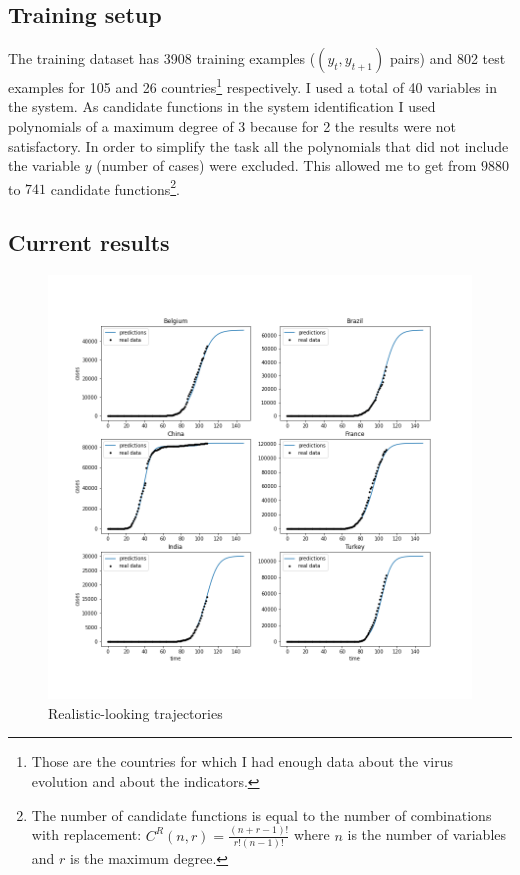 \documentclass[12pt, a4]{article}
\begin{document}
\subsection*{Training setup}

The training dataset has 3908 training examples ($(y_t, y_{t+1})$ pairs) and 802 test examples for 105 and 26 countries\footnote{Those are the countries for which I had enough data about the virus evolution and about the indicators.} respectively. 
I used a total of 40 variables in the system. 
As candidate functions in the system identification I used polynomials of a maximum degree of 3 because for 2 the results were not satisfactory. 
In order to simplify the task all the polynomials that did not include the variable $y$ (number of cases) were excluded. 
This allowed me to get from $9880$ to $741$ candidate functions\footnote{The number of candidate functions is equal to the number of combinations with replacement: $C^R(n,r) = \frac{(n + r - 1)!}{ r! (n - 1)! }$ where $n$ is the number of variables and $r$ is the maximum degree.}.

\subsection*{Current results}

\begin{figure}[!]
  \includegraphics[width=\linewidth]{successful.png}
  \caption{Realistic-looking trajectories}
  \label{fig:successful}
\end{figure}
\end{document}
